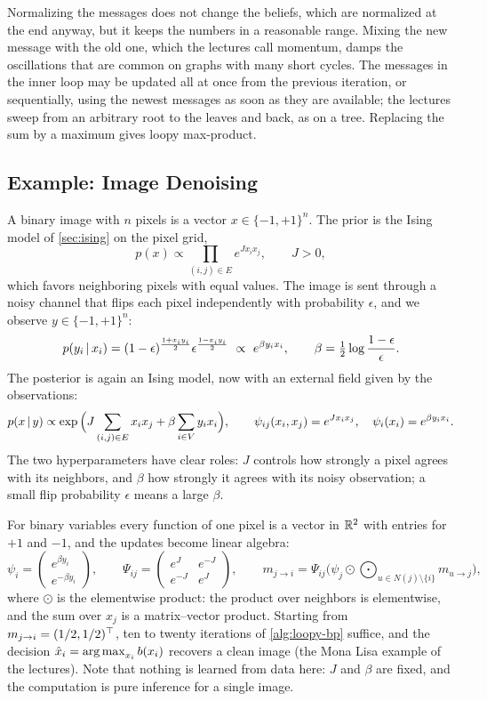 Normalizing the messages does not change the beliefs, which are normalized at the end anyway, but it keeps the numbers in a reasonable range. Mixing the new message with the old one, which the lectures call momentum, damps the oscillations that are common on graphs with many short cycles. The messages in the inner loop may be updated all at once from the previous iteration, or sequentially, using the newest messages as soon as they are available; the lectures sweep from an arbitrary root to the leaves and back, as on a tree. Replacing the sum by a maximum gives loopy max-product.

\subsection{Example: Image Denoising}

A binary image with $n$ pixels is a vector $x\in\{-1,+1\}^n$. The prior is the Ising model of \cref{sec:ising} on the pixel grid,
\[
p(x)\propto\prod_{(i,j)\in E}e^{Jx_ix_j},\qquad J>0,
\]
which favors neighboring pixels with equal values. The image is sent through a noisy channel that flips each pixel independently with probability $\epsilon$, and we observe $y\in\{-1,+1\}^n$:
\[
p(y_i\given x_i)=(1-\epsilon)^{\frac{1+x_iy_i}2}\epsilon^{\frac{1-x_iy_i}2}\ \propto\ e^{\beta y_ix_i},\qquad\beta=\tfrac12\log\frac{1-\epsilon}{\epsilon}.
\]
The posterior is again an Ising model, now with an external field given by the observations:
\[
p(x\,|\, y)\propto\exp\Big(J\sum_{(i,j)\in E}x_ix_j+\beta\sum_{i\in V}y_ix_i\Big),\qquad\psi_{ij}(x_i,x_j)=e^{Jx_ix_j},\quad\psi_i(x_i)=e^{\beta y_ix_i}.
\]
The two hyperparameters have clear roles: $J$ controls how strongly a pixel agrees with its neighbors, and $\beta$ how strongly it agrees with its noisy observation; a small flip probability $\epsilon$ means a large $\beta$.

For binary variables every function of one pixel is a vector in $\mathbb{R}^2$ with entries for $+1$ and $-1$, and the updates become linear algebra:
\[
\psi_i=\begin{pmatrix}e^{\beta y_i}\\ e^{-\beta y_i}\end{pmatrix},\qquad
\Psi_{ij}=\begin{pmatrix}e^{J}&e^{-J}\\ e^{-J}&e^{J}\end{pmatrix},\qquad
m_{j\to i}=\Psi_{ij}\Big(\psi_j\odot\bigodot_{u\in N(j)\setminus\{i\}}m_{u\to j}\Big),
\]
where $\odot$ is the elementwise product: the product over neighbors is elementwise, and the sum over $x_j$ is a matrix--vector product. Starting from $m_{j\to i}=(1/2,1/2)^{\top}$, ten to twenty iterations of \cref{alg:loopy-bp} suffice, and the decision $\hat x_i=\operatorname*{arg\,max}_{x_i}b(x_i)$ recovers a clean image (the Mona Lisa example of the lectures). Note that nothing is learned from data here: $J$ and $\beta$ are fixed, and the computation is pure inference for a single image.

